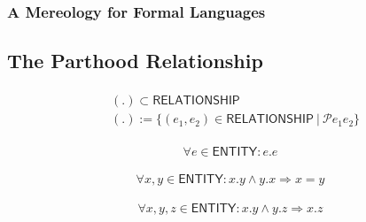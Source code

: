 \documentclass[runningheads,a4paper]{llncs}
\newcommand{\ENTITY}{\mathsf{ENTITY}}
\newcommand{\RELATIONSHIP}{\mathsf{RELATIONSHIP}}
\begin{document}
\subsubsection{A Mereology for Formal Languages}

\subsection{The Parthood Relationship}

\begin{align}
\begin{split}
& (.)  \subset \RELATIONSHIP
\\ & (.) := \{ (e_1,e_2) \in \RELATIONSHIP ~|~ \mathcal{P} e_1 e_2 \}
\end{split}
\end{align}

\begin{align}
\forall e \in \ENTITY : e . e
\end{align}

\begin{align}
\forall x,y \in \ENTITY : x . y \wedge y . x \Rightarrow x = y
\end{align}

\begin{align}
\forall x,y,z \in \ENTITY : x . y \wedge y . z \Rightarrow x . z
\end{align}





{}
\end{document}
